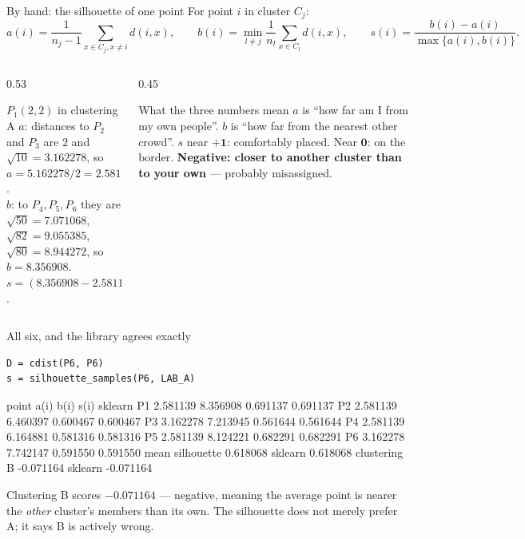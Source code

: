\documentclass[aspectratio=169]{beamer}
\begin{document}
\begin{frame}[shrink=6]{By hand: the silhouette of one point}
  For point $i$ in cluster $C_j$:
  \[
    a(i) = \frac{1}{n_j - 1}\!\!\sum_{x \in C_j, x \neq i}\!\! d(i,x),
    \qquad
    b(i) = \min_{l \neq j} \frac{1}{n_l}\sum_{x \in C_l} d(i,x),
    \qquad
    s(i) = \frac{b(i) - a(i)}{\max\{a(i), b(i)\}}.
  \]
  \begin{columns}[T]
    \begin{column}{0.53\textwidth}
      \begin{block}{$P_1(2,2)$ in clustering A}
        $a$: distances to $P_2$ and $P_3$ are $2$ and
        $\sqrt{10} = 3.162278$, so
        $a = 5.162278/2 = 2.581139$.\\[0.3em]
        $b$: to $P_4, P_5, P_6$ they are $\sqrt{50}=7.071068$,
        $\sqrt{82}=9.055385$, $\sqrt{80}=8.944272$, so $b = 8.356908$.\\[0.3em]
        $s = (8.356908 - 2.581139)/8.356908 = \mathbf{0.691137}$.
      \end{block}
    \end{column}
    \begin{column}{0.45\textwidth}
      \begin{alertblock}{What the three numbers mean}
        $a$ is ``how far am I from my own people''. $b$ is ``how far from the
        nearest other crowd''. $s$ near $\mathbf{+1}$: comfortably placed.
        Near $\mathbf{0}$: on the border. \textbf{Negative: closer to another
        cluster than to your own} --- probably misassigned.
      \end{alertblock}
    \end{column}
  \end{columns}
\end{frame}

\begin{frame}[fragile,shrink=10]{All six, and the library agrees exactly}
\begin{lstlisting}
D = cdist(P6, P6)
s = silhouette_samples(P6, LAB_A)
\end{lstlisting}
\begin{outblk}
point       a(i)      b(i)      s(i)   sklearn
  P1    2.581139  8.356908  0.691137  0.691137
  P2    2.581139  6.460397  0.600467  0.600467
  P3    3.162278  7.213945  0.561644  0.561644
  P4    2.581139  6.164881  0.581316  0.581316
  P5    2.581139  8.124221  0.682291  0.682291
  P6    3.162278  7.742147  0.591550  0.591550
mean silhouette  0.618068   sklearn 0.618068
clustering B     -0.071164   sklearn -0.071164
\end{outblk}
  \begin{center}\small
    Clustering B scores $\mathbf{-0.071164}$ --- negative, meaning the
    average point is nearer the \emph{other} cluster's members than its own.
    The silhouette does not merely prefer A; it says B is actively wrong.
  \end{center}
\end{frame}
\end{document}
